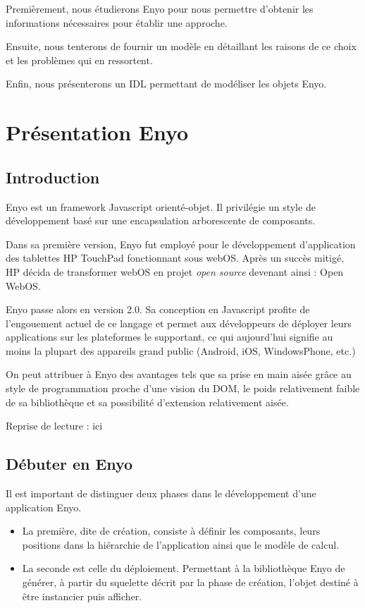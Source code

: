 \documentclass[11pt,a4paper]{report}
\begin{document}
Premièrement, nous étudierons Enyo pour nous permettre d'obtenir les informations nécessaires 
pour établir une approche.

Ensuite, nous tenterons de fournir un modèle en détaillant les raisons de ce choix et les problèmes
qui en ressortent.

Enfin, nous présenterons un IDL permettant de modéliser les objets Enyo.

\chapter{Présentation Enyo}\label{chap:enyo}
\section{Introduction}
Enyo\cite{enyo} est un framework Javascript orienté-objet. Il privilégie un style de développement basé
sur une encapsulation arborescente de composants.\medskip

Dans sa première version, Enyo fut employé pour le développement d'application des 
tablettes HP TouchPad fonctionnant sous webOS. Après un succès mitigé,
HP décida de transformer webOS en projet \emph{open source} devenant ainsi : Open WebOS.\medskip

Enyo passe alors en version 2.0. Sa conception en Javascript profite de  
l'engouement actuel de ce langage et permet aux développeurs de déployer leurs 
applications sur les plateformes le supportant, ce qui aujourd'hui signifie au moins 
la plupart des appareils grand public (Android, iOS, WindowsPhone, etc.)\medskip

On peut attribuer à Enyo des avantages tels que sa prise en main aisée grâce au style 
de programmation proche d'une vision du DOM, le poids relativement faible de sa bibliothèque
et sa possibilité d'extension relativement aisée.

\clearpage

Reprise de lecture : ici
\section{Débuter en Enyo}

Il est important de distinguer deux phases dans le développement d'une application 
Enyo.
\begin{itemize}
\item La première, dite de création, consiste à définir les composants, leurs positions dans 
la hiérarchie de l'application ainsi que le modèle de calcul. 
\item La seconde est celle du déploiement. Permettant à la bibliothèque Enyo de 
générer, à partir du squelette décrit par la phase de création, l'objet destiné
à être instancier puis afficher.
\end{itemize}\medskip
\end{document}
